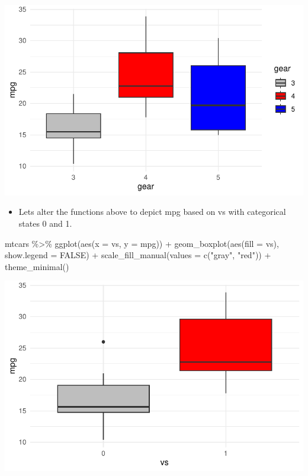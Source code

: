 \documentclass[
  letterpaper,
  DIV=11,
  numbers=noendperiod]{scrreprt}
\newenvironment{Shaded}{\begin{snugshade}}{\end{snugshade}}
\newcommand{\AttributeTok}[1]{\textcolor[rgb]{0.40,0.45,0.13}{#1}}
\newcommand{\ConstantTok}[1]{\textcolor[rgb]{0.56,0.35,0.01}{#1}}
\newcommand{\FunctionTok}[1]{\textcolor[rgb]{0.28,0.35,0.67}{#1}}
\newcommand{\NormalTok}[1]{\textcolor[rgb]{0.00,0.23,0.31}{#1}}
\newcommand{\SpecialCharTok}[1]{\textcolor[rgb]{0.37,0.37,0.37}{#1}}
\newcommand{\StringTok}[1]{\textcolor[rgb]{0.13,0.47,0.30}{#1}}
\providecommand{\tightlist}{%
  \setlength{\itemsep}{0pt}\setlength{\parskip}{0pt}}\usepackage{longtable,booktabs,array}
\begin{document}
\includegraphics{dataviz_files/figure-pdf/unnamed-chunk-41-1.pdf}

\begin{itemize}
\tightlist
\item
  Lets alter the functions above to depict mpg based on vs with
  categorical states 0 and 1.
\end{itemize}

\begin{Shaded}
\begin{Highlighting}[]
\NormalTok{mtcars }\SpecialCharTok{\%\textgreater{}\%}
    \FunctionTok{ggplot}\NormalTok{(}\FunctionTok{aes}\NormalTok{(}\AttributeTok{x =}\NormalTok{ vs, }\AttributeTok{y =}\NormalTok{ mpg)) }\SpecialCharTok{+} \FunctionTok{geom\_boxplot}\NormalTok{(}\FunctionTok{aes}\NormalTok{(}\AttributeTok{fill =}\NormalTok{ vs), }\AttributeTok{show.legend =} \ConstantTok{FALSE}\NormalTok{) }\SpecialCharTok{+}
    \FunctionTok{scale\_fill\_manual}\NormalTok{(}\AttributeTok{values =} \FunctionTok{c}\NormalTok{(}\StringTok{"gray"}\NormalTok{, }\StringTok{"red"}\NormalTok{)) }\SpecialCharTok{+} \FunctionTok{theme\_minimal}\NormalTok{()}
\end{Highlighting}
\end{Shaded}

\includegraphics{dataviz_files/figure-pdf/unnamed-chunk-42-1.pdf}
\end{document}
